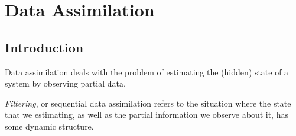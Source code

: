 \chapter{Data Assimilation}\label{ch:filtering}
\localtableofcontents

\section{Introduction}

Data assimilation deals with the problem of estimating the
(hidden) state of a system by observing partial data.


\emph{Filtering}, or sequential data assimilation refers to the
situation where the state that we estimating, as well
as the partial information we observe about it, has some dynamic
structure.






